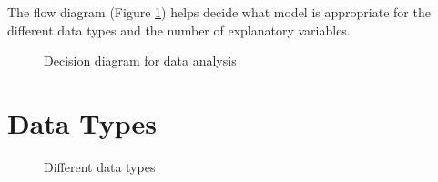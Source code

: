 \documentclass[a4paper, 10pt, fleqn, twosided]{memoir}
\begin{document}
The flow diagram (Figure \ref{fig:lmflow}) helps decide what model is appropriate for the different data types and the
number of explanatory variables.

\clearpage
\begin{landscape}
\begin{figure}[!hbtp]
\centering
{}
\caption{Decision diagram for data analysis}
\label{fig:lmflow}
\end{figure}
\end{landscape}


\section{Data Types}

\begin{figure}[!hbtp]
\centering
{}
\caption{Different data types}
\label{fig:dt}
\end{figure}
\end{document}
